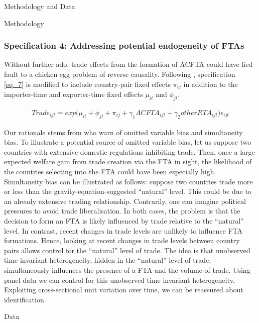\begin{section}{Methodology and Data }
\begin{subsection}{Methodology }
\subsubsection*{Specification 4: Addressing potential endogeneity of FTAs}

Without further ado, trade effects from the formation of ACFTA could have lied fault to a chicken egg problem of reverse causality. Following \cite{ypl_2016}, specification \ref{eq_7} is modified to include country-pair fixed effects $\pi_{ij}$ in addition to the importer-time and exporter-time fixed effects $\mu_{it}$ and $\phi_{jt}$.

\begin{multline}\label{eq_8}
Trade_{ijt} = exp \Big(\mu_{it} + \phi_{jt} + \pi_{ij} + 
\gamma_1 ACFTA_{ijt} + \gamma_2 otherRTA_{ijt}\Big) \epsilon_{ijt}
\end{multline}

Our rationale stems from \cite{bb_2007} who warn of omitted variable bias and simultaneity bias. 
To illustrate a potential source of omitted variable bias, let us suppose two countries with extensive domestic regulations inhibiting trade. Then, once a large expected welfare gain from trade creation via the FTA in sight, the likelihood of the countries selecting into the FTA could have been especially high. 
Simultaneity bias can be illustrated as follows: suppose two countries trade more or less than the gravity-equation-suggested “natural” level. This could be due to an already extensive trading relationship. Contrarily, one can imagine political pressures to avoid trade liberalisation. In both cases, the problem is that the decision to form an FTA is likely influenced by trade relative to the “natural” level. In contrast, recent changes in trade levels are unlikely to influence FTA formations. Hence, looking at recent changes in trade levels between country pairs allows control for the “natural” level of trade. The idea is that unobserved time invariant heterogeneity, hidden in the “natural” level of trade, simultaneously influences the presence of a FTA and the volume of trade. Using panel data we can control for this unobserved time invariant heterogeneity. Exploiting cross-sectional unit variation over time, we can be reassured about identification. 

\end{subsection}



\begin{subsection}{Data}


\end{subsection}
\end{section}

